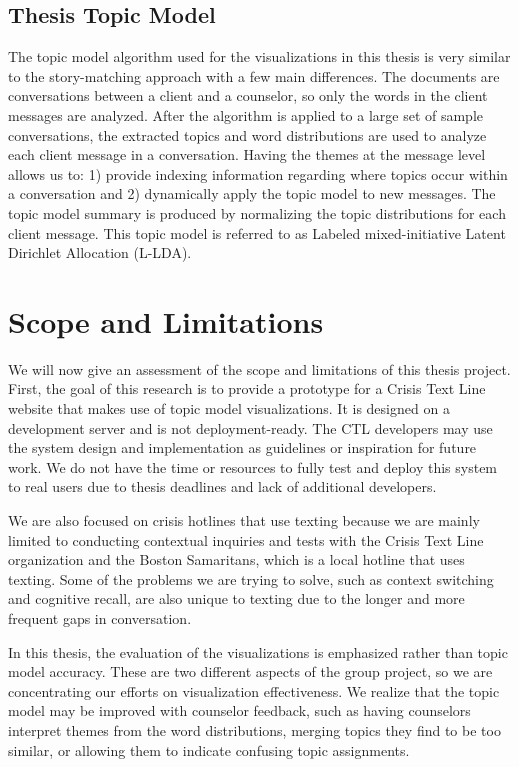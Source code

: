 \subsection{Thesis Topic Model}

The topic model algorithm used for the visualizations in this thesis is very similar to
the story-matching approach with a few main differences. The documents are
conversations between a client and a counselor, so only the words in the client messages
are analyzed. After the algorithm is applied to a large set of sample conversations,
the extracted topics and word distributions are used to analyze each client message
in a conversation. Having the themes at the message level allows us to: 1) provide
indexing information regarding where topics occur within a conversation and 2)
dynamically apply the topic model to new messages. The topic model summary is
produced by normalizing the topic distributions for each client message. This topic
model is referred to as Labeled mixed-initiative Latent Dirichlet Allocation (L-LDA).

\section{Scope and Limitations}

We will now give an assessment of the scope and limitations of this thesis project.
First, the goal of this research is to provide a prototype for a Crisis Text Line website
that makes use of topic model visualizations. It is designed on a development server
and is not deployment-ready. The CTL developers may use the system design and
implementation as guidelines or inspiration for future work. We do not have the time
or resources to fully test and deploy this system to real users due to thesis deadlines
and lack of additional developers.

We are also focused on crisis hotlines that use texting because we are mainly
limited to conducting contextual inquiries and tests with the Crisis Text Line
organization and the Boston Samaritans, which is a local hotline that uses texting. Some
of the problems we are trying to solve, such as context switching and cognitive recall,
are also unique to texting due to the longer and more frequent gaps in conversation.

In this thesis, the evaluation of the visualizations is emphasized rather than topic
model accuracy. These are two different aspects of the group project, so we are
concentrating our efforts on visualization effectiveness. We realize that the topic
model may be improved with counselor feedback, such as having counselors interpret
themes from the word distributions, merging topics they find to be too similar, or
allowing them to indicate confusing topic assignments.

